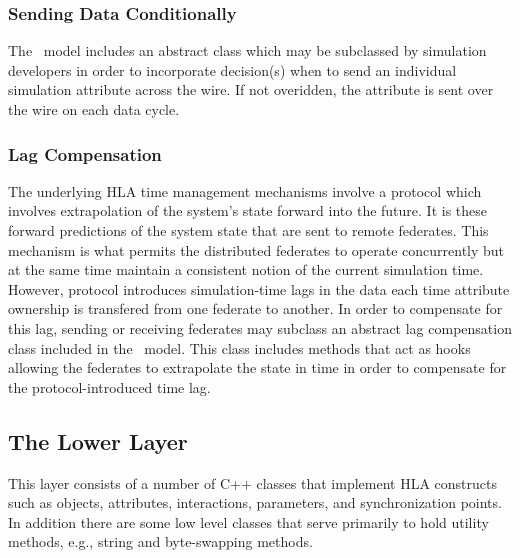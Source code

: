 \subsubsection{Sending Data Conditionally}

The \TrickHLA\ model includes an abstract class which may be subclassed by 
simulation developers in order to incorporate decision(s) when to send an individual
simulation attribute across the wire. If not overidden, the attribute is sent over the
wire on each data cycle.

\subsubsection{Lag Compensation}

The underlying HLA time management mechanisms involve a protocol which involves 
extrapolation of the system's state forward into the future. 
It is these forward predictions of the system state that are sent to remote federates.
This mechanism is what permits the distributed federates to operate concurrently 
but at the same time maintain a consistent notion of the current simulation time.
However, protocol introduces simulation-time lags in the data each time attribute
ownership is transfered from one federate to another.
In order to compensate for this lag, sending or receiving federates may subclass
an abstract lag compensation class included in the \TrickHLA\ model.
This class includes methods that act as hooks allowing the federates to 
extrapolate the state in time in order to compensate for the protocol-introduced
time lag.

\subsection{The Lower Layer}

This layer consists of a number of C++ classes that implement HLA constructs such as
objects, attributes, interactions, parameters, and synchronization points.
In addition there are some low level classes that serve primarily to hold utility methods,
e.g., string and byte-swapping methods.

